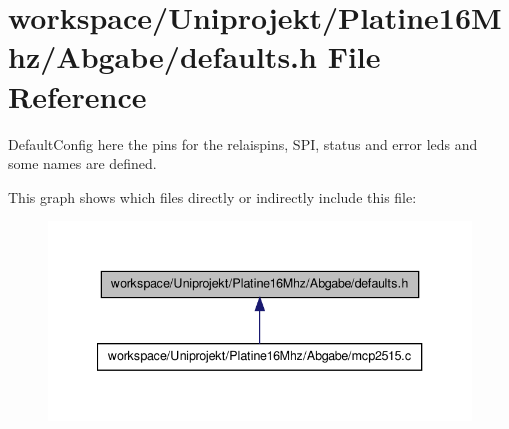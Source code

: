 \section{workspace/\-Uniprojekt/\-Platine16\-Mhz/\-Abgabe/defaults.h \-File \-Reference}
\label{defaults_8h}


\-Default\-Config here the pins for the relaispins, \-S\-P\-I, status and error leds and some names are defined.  


\-This graph shows which files directly or indirectly include this file\-:\nopagebreak
\begin{figure}[H]
\begin{center}
\leavevmode
\includegraphics[width=340pt]{defaults_8h__dep__incl}
\end{center}
\end{figure}
